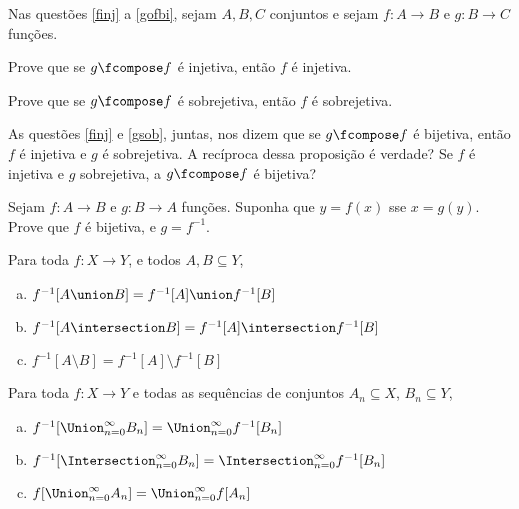 Nas questões \ref{finj} a \ref{gofbi}, sejam $A,B,C$ conjuntos e sejam $f : A \to B$ e $g : B \to C$ funções.

\begin{exercise}
\label{finj}
    Prove que se $g \fcompose f$ é injetiva, então $f$ é injetiva.
\end{exercise}

\begin{exercise}
\label{gsob}
    Prove que se $g \fcompose f$ é sobrejetiva, então $f$ é sobrejetiva.
\end{exercise}

\begin{exercise}
\label{gofbi}
    As questões \ref{finj} e \ref{gsob}, juntas, nos dizem que se $g \fcompose f$ é bijetiva, então $f$ é injetiva e $g$ é sobrejetiva. A recíproca dessa proposição é verdade? Se $f$ é injetiva e $g$ sobrejetiva, a $g \fcompose f$ é bijetiva?
\end{exercise}

\begin{exercise}
    Sejam $f : A \to B$ e $g : B \to A$ funções. Suponha que $y = f(x)$ sse $x = g(y)$. Prove que $f$ é bijetiva, e $g = f^{-1}$.
\end{exercise}

\begin{exercise}
    Para toda $f : X \to Y$, e todos $A, B \subseteq Y$,
    \begin{enumerate}[(a)]
        \item $f^{-1}[A \union B] = f^{-1}[A] \union f^{-1}[B]$
        \item $f^{-1}[A \intersection B] = f^{-1}[A] \intersection f^{-1}[B]$
        \item $f^{-1}[A \setminus B] = f^{-1} [A] \setminus f^{-1}[B]$
    \end{enumerate}
\end{exercise}

\begin{exercise}
    Para toda $f : X \to Y$ e todas as sequências de conjuntos $A_n \subseteq X$, $B_n \subseteq Y$,
    \begin{enumerate}[(a)]
        \item $f^{-1}[\Union^{\infty}_{n=0} B_n] = \Union^{\infty}_{n=0} f^{-1}[B_n]$
        \item $f^{-1}[\Intersection^{\infty}_{n=0} B_n] = \Intersection^{\infty}_{n=0} f^{-1}[B_n]$
        \item $f[\Union^{\infty}_{n=0} A_n] = \Union^{\infty}_{n=0} f[A_n]$
    \end{enumerate}
\end{exercise}
